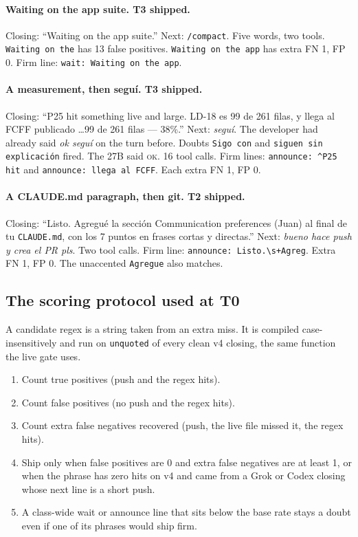 \paragraph{Waiting on the app suite. T3 shipped.}
Closing: ``Waiting on the app suite.''
Next: \texttt{/compact}.
Five words, two tools. \texttt{Waiting on the} has 13 false
positives. \texttt{Waiting on the app} has extra FN 1, FP 0. Firm
line: \texttt{wait: Waiting on the app}.

\paragraph{A measurement, then segu\'i. T3 shipped.}
Closing: ``P25 hit something live and large. LD-18 es 99 de 261
filas, y llega al FCFF publicado \ldots 99 de 261 filas --- 38\%.''
Next: \emph{segu\'i}.
The developer had already said \emph{ok segu\'i} on the turn
before. Doubts \texttt{Sigo con} and \texttt{siguen sin
explicaci\'on} fired. The 27B said \textsc{ok}. 16 tool calls.
Firm lines: \texttt{announce: \^{}P25 hit} and \texttt{announce:
llega al FCFF}. Each extra FN 1, FP 0.

\paragraph{A CLAUDE.md paragraph, then git. T2 shipped.}
Closing: ``Listo. Agregu\'e la secci\'on Communication preferences
(Juan) al final de tu \texttt{CLAUDE.md}, con los 7 puntos en frases
cortas y directas.''
Next: \emph{bueno hace push y crea el PR pls}.
Two tool calls. Firm line: \texttt{announce: Listo.\textbackslash s+Agreg}.
Extra FN 1, FP 0. The unaccented \texttt{Agregue} also matches.

\subsection{The scoring protocol used at T0}
\label{app:protocol}

A candidate regex is a string taken from an extra miss. It is
compiled case-insensitively and run on \texttt{unquoted} of every
clean v4 closing, the same function the live gate uses.

\begin{enumerate}
\item Count true positives (push and the regex hits).
\item Count false positives (no push and the regex hits).
\item Count extra false negatives recovered (push, the live file
missed it, the regex hits).
\item Ship only when false positives are 0 and extra false
negatives are at least 1, or when the phrase has zero hits on v4
and came from a Grok or Codex closing whose next line is a short
push.
\item A class-wide wait or announce line that sits below the base
rate stays a doubt even if one of its phrases would ship firm.
\end{enumerate}

